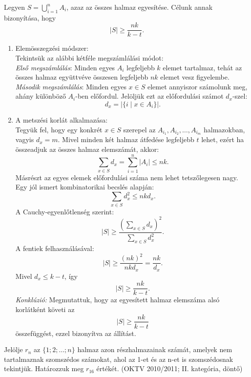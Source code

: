 \begin{solution}
	Legyen $S=\bigcup_{i=1}^{n}A_{i}$, azaz az összes halmaz egyesítése.
	Célunk annak bizonyítása, hogy 
	\[
	|S|\geq\frac{nk}{k-t}.
	\]
	\begin{enumerate}
		\item Elemösszegzési módszer:\\
		Tekintsük az alábbi kétféle megszámlálási módot:\\
		\emph{Első megszámlálás}: Minden egyes $A_{i}$ legfeljebb $k$ elemet
		tartalmaz, tehát az összes halmaz együttvéve összesen legfeljebb $nk$
		elemet vesz figyelembe. \\
		\emph{Második megszámlálás}: Minden egyes $x\in S$ elemet annyiszor
		számolunk meg, ahány különböző $A_{i}$-ben előfordul. Jelöljük ezt
		az előfordulási számot $d_{x}$-szel: 
		\[
		d_{x}=|\{i\mid x\in A_{i}\}|.
		\]
		\item A metszési korlát alkalmazása:\\
		Tegyük fel, hogy egy konkrét $x\in S$ szerepel az $A_{i_{1}},A_{i_{2}},\dots,A_{i_{m}}$
		halmazokban, vagyis $d_{x}=m$. Mivel minden két halmaz átfedése legfeljebb
		$t$ lehet, ezért ha összeadjuk az összes halmaz elemszámát, akkor:
		\[
		\sum_{x\in S}d_{x}=\sum_{i=1}^{n}|A_{i}|\leq nk.
		\]
		Másrészt az egyes elemek előfordulási száma nem lehet tetszőlegesen
		nagy. Egy jól ismert kombinatorikai becslés alapján:
		\[
		\sum_{x\in S}d_{x}^{2}\leq nkd_{x}.
		\]
		A Cauchy-egyenlőtlenség szerint:
		\[
		|S|\geq\frac{\left(\sum_{x\in S}d_{x}\right)^{2}}{\sum_{x\in S}d_{x}^{2}}.
		\]
		A fentiek felhasználásával:
		\[
		|S|\geq\frac{(nk)^{2}}{nkd_{x}}=\frac{nk}{d_{x}}.
		\]
		Mivel $d_{x}\leq k-t$, így
		\[
		|S|\geq\frac{nk}{k-t}.
		\]
		\emph{Konklúzió:} Megmutattuk, hogy az egyesített halmaz elemszáma
		alsó korlátként követi az
		\[
		|S|\geq\frac{nk}{k-t}
		\]
		összefüggést, ezzel bizonyítva az állítást.
	\end{enumerate}
\end{solution}
\begin{extraproblem}
	Jelölje $r_{n}$ az $\{1;2;\ldots;n\}$ halmaz azon részhalmazainak
	számát, amelyek nem tartalmaznak szomszédos számokat, ahol az 1-et
	és az n-et is szomszédosnak tekintjük. Határozzuk meg $r_{16}$ értékét.
	(OKTV 2010/2011; II. kategória, döntő)
\end{extraproblem}
